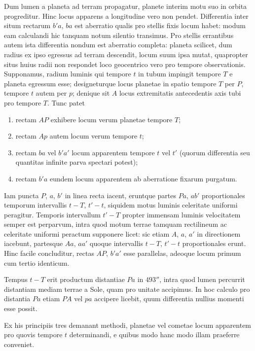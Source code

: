 \documentclass[12pt,a4paper]{article}
\begin{document}
Dum lumen a planeta ad terram propagatur, planete interim motu suo in orbita progreditur. Hinc locus apparens a longitudine vero non pendet. Differentia inter situm rectarum $b'a$, $ba$ est aberratio qualis pro stellis fixis locum habet: modum eam calculandi hic tanquam notum silentio transimus. Pro stellis errantibus autem ista differentia nondum est aberratio completa: planeta scilicet, dum radius ex ipso egressus ad terram descendit, locum suum ipsa mutat, quapropter situs huius radii non respondet loco geocentrico vero pro tempore observationis. Supponamus, radium luminis qui tempore $t$ in tubum impingit tempore $T$ e planeta egressum esse; designeturque locus planetae in spatio tempore $T$ per $P$, tempore $t$ autem per $p$; denique sit $A$ locus extremitatis antecedentis axis tubi pro tempore $T$. Tunc patet
\begin{enumerate}[label=\arabic*$^\circ$]
\item rectam $AP$ exhibere locum verum planetae tempore $T$;
\item rectam $Ap$ autem locum verum tempore $t$;
\item rectam $ba$ vel $b'a'$ locum apparentem tempore $t$ vel $t'$ (quorum differentia seu quantitas infinite parva spectari potest);
\item rectam $b'a$ eundem locum apparentem ab aberratione fixarum purgatum.
\end{enumerate}

Iam puncta $P$, $a$, $b'$ in linea recta iacent, eruntque partes $Pa$, $ab'$ proportionales temporum intervallis $t-T$, $t'-t$, siquidem motus luminis celeritate uniformi peragitur. Temporis intervallum $t'-T$ propter immensam luminis velocitatem semper est perparvum, intra quod motum terrae tamquam rectilineum ac celeritate uniformi peractum supponere licet: sic etiam $A$, $a$, $a'$ in directionem iacebunt, partesque $Aa$, $aa'$ quoque intervallis $t-T$, $t'-t$ proportionales erunt. Hinc facile concluditur, rectas $AP$, $b'a'$ esse parallelas, adeoque locum primum cum tertio identicum.

Tempus $t-T$ erit productum distantiae $Pa$ in $493''$, intra quod lumen percurrit distantiam mediam terrae a Sole, quam pro unitate accipimus. In hoc calculo pro distantia $Pa$ etiam $PA$ vel $pa$ accipere licebit, quum differentia nullius momenti esse possit.

Ex his principiis tres demanant methodi, planetae vel cometae locum apparentem pro quovis tempore $t$ determinandi, e quibus modo hanc modo illam praeferre conveniet.
\end{document}
